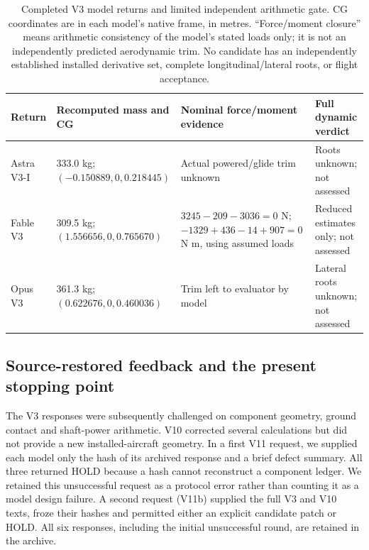 \documentclass[10pt,letterpaper]{article}
\begin{document}
\begin{table}[H]\centering\footnotesize
\caption{Completed V3 model returns and limited independent arithmetic gate. CG coordinates are in each model's native frame, in metres. ``Force/moment closure'' means arithmetic consistency of the model's stated loads only; it is not an independently predicted aerodynamic trim. No candidate has an independently established installed derivative set, complete longitudinal/lateral roots, or flight acceptance.}\label{tab:v3returns}
\begin{tabularx}{\linewidth}{lXXX}\toprule
Return & Recomputed mass and CG & Nominal force/moment evidence & Full dynamic verdict\\\midrule
Astra V3-I & 333.0 kg; $(-0.150889,0,0.218445)$ & Actual powered/glide trim unknown & Roots unknown; not assessed\\
Fable V3 & 309.5 kg; $(1.556656,0,0.765670)$ & $3245-209-3036=0$ N; $-1329+436-14+907=0$ N m, using assumed loads & Reduced estimates only; not assessed\\
Opus V3 & 361.3 kg; $(0.622676,0,0.460036)$ & Trim left to evaluator by model & Lateral roots unknown; not assessed\\\bottomrule
\end{tabularx}
\end{table}

\subsection{Source-restored feedback and the present stopping point}
The V3 responses were subsequently challenged on component geometry, ground contact and shaft-power arithmetic. V10 corrected several calculations but did not provide a new installed-aircraft geometry. In a first V11 request, we supplied each model only the hash of its archived response and a brief defect summary. All three returned HOLD because a hash cannot reconstruct a component ledger. We retained this unsuccessful request as a protocol error rather than counting it as a model design failure. A second request (V11b) supplied the full V3 and V10 texts, froze their hashes and permitted either an explicit candidate patch or HOLD. All six responses, including the initial unsuccessful round, are retained in the archive.
\end{document}
